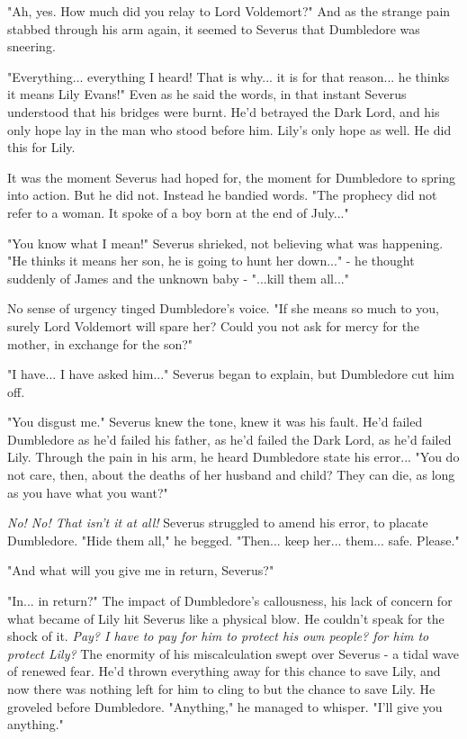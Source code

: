 \documentclass[a4paper,11pt]{article}
\begin{document}
"Ah, yes. How much did you relay to Lord Voldemort?" And as the strange pain stabbed through his arm again, it seemed to Severus that Dumbledore was sneering.

"Everything... everything I heard! That is why... it is for that reason... he thinks it means Lily Evans!" Even as he said the words, in that instant Severus understood that his bridges were burnt. He'd betrayed the Dark Lord, and his only hope lay in the man who stood before him. Lily's only hope as well. He did this for Lily.

It was the moment Severus had hoped for, the moment for Dumbledore to spring into action. But he did not. Instead he bandied words. "The prophecy did not refer to a woman. It spoke of a boy born at the end of July..."

"You know what I mean!" Severus shrieked, not believing what was happening. "He thinks it means her son, he is going to hunt her down..." - he thought suddenly of James and the unknown baby - "...kill them all..."

No sense of urgency tinged Dumbledore's voice. "If she means so much to you, surely Lord Voldemort will spare her? Could you not ask for mercy for the mother, in exchange for the son?"

"I have... I have asked him..." Severus began to explain, but Dumbledore cut him off.

"You disgust me." Severus knew the tone, knew it was his fault. He'd failed Dumbledore as he'd failed his father, as he'd failed the Dark Lord, as he'd failed Lily. Through the pain in his arm, he heard Dumbledore state his error... "You do not care, then, about the deaths of her husband and child? They can die, as long as you have what you want?"

\emph{No! No! That isn't it at all!} Severus struggled to amend his error, to placate Dumbledore. "Hide them all," he begged. "Then... keep her... them... safe. Please."

"And what will you give me in return, Severus?"

"In... in return?" The impact of Dumbledore's callousness, his lack of concern for what became of Lily hit Severus like a physical blow. He couldn't speak for the shock of it. \emph{Pay? I have to pay for him to protect his own people? for him to protect Lily?} The enormity of his miscalculation swept over Severus - a tidal wave of renewed fear. He'd thrown everything away for this chance to save Lily, and now there was nothing left for him to cling to but the chance to save Lily. He groveled before Dumbledore. "Anything," he managed to whisper. "I'll give you anything."
\end{document}
